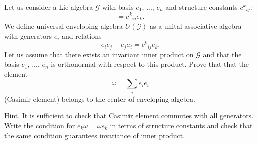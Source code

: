 \begin{exercise}
Let us consider a Lie algebra $\mathscr{G}$ with basis $e_1$,
$...$, $e_n$ and structure constants ${c^{k}}_{ij}$:
\begin{equation}
  [e_i , e_j ] = {c^{k}}_{ij} e_k.
\end{equation}
We define universal enveloping algebra $U(\mathscr{G})$ as a
unital associative algebra with generators $e_i$ and relations
\begin{equation}    
e_i e_j - e_j e_i = {c^{k}}_{ij} e_k.
\end{equation}
Let us assume that there exists an invariant inner product on $\mathscr{G}$
and that the basis $e_1$, $...$, $e_n$ is orthonormal with
respect to this product. Prove that that the element 
\begin{equation}
\omega=\sum_{i}  e_i e_i
\end{equation}
(Casimir element) belongs to the center of enveloping algebra.

Hint. It is sufficient to check that Casimir element commutes
with all generators. Write the condition for $e_k \omega = \omega
e_k$ in terms of structure constants and check that the same
condition guarantees invariance of inner product. 
\end{exercise}

